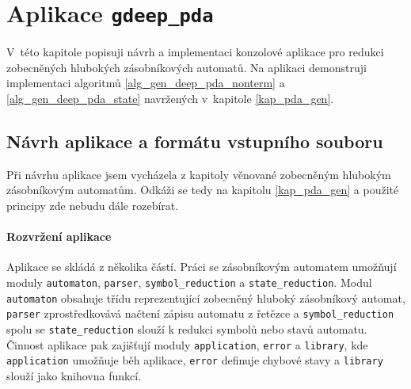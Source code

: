 
\chapter{Aplikace \texttt{gdeep\_pda}} \label{kap_aplikace}

V~této kapitole popisuji návrh a implementaci konzolové aplikace pro redukci zobecněných hlubokých zásobníkových automatů. Na aplikaci demonstruji implementaci algoritmů \ref{alg_gen_deep_pda_nonterm} a \ref{alg_gen_deep_pda_state} navržených v~kapitole \ref{kap_pda_gen}.


\section{Návrh aplikace a formátu vstupního souboru}


Při návrhu aplikace jsem vycházela z kapitoly věnované zobecněným hlubokým zásobníkovým automatům. Odkáži se tedy na kapitolu \ref{kap_pda_gen} a použité principy zde nebudu dále rozebírat. %

\subsubsection{Rozvržení aplikace}\label{kap_aplikace_rozvrzeni}

Aplikace se skládá z několika částí. Práci se zásobníkovým automatem umožňují moduly \texttt{automaton}, \texttt{parser}, \texttt{symbol\_reduction} a \texttt{state\_reduction}. 
Modul \texttt{automaton} obsahuje třídu reprezentující zobecněný hluboký zásobníkový automat, \texttt{parser} zprostředkovává načtení zápisu automatu z řetězce a \texttt{symbol\_reduction} spolu se \texttt{state\_reduction} slouží k redukci symbolů nebo stavů automatu.
Činnost aplikace pak zajišťují moduly \texttt{application}, \texttt{error} a \texttt{library}, kde \texttt{application} umožňuje běh aplikace, \texttt{error} definuje chybové stavy a \texttt{library} slouží jako knihovna funkcí.

